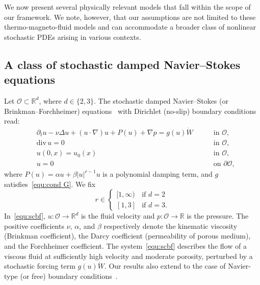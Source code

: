 \documentclass[11pt, reqno]{amsart}
\theoremstyle{definition}
\numberwithin{equation}{section}
\newcommand{\bb}{\mathbb}
\newcommand{\divg}{\mathrm{div}\,}
\newcommand{\abs}[1]{\left|{#1}\right|}
\begin{document}
We now present several physically relevant models that fall within the scope of our framework. We note, however, that our assumptions are not limited to these thermo-magneto-fluid models and can accommodate a broader class of nonlinear stochastic PDEs arising in various contexts.


\subsection{A class of stochastic damped Navier--Stokes equations}\label{sec:scbf}

Let $\mathscr{O}\subset\bb{R}^d$, where $d\in \{2,3\}$. The stochastic damped Navier--Stokes (or Brinkman--Forchheimer) equations~\cite{BrzFer19, CaiJiu08, GaoLiu19b, GaoLiu19, HajRob17, KinCipMoh25, KinMoh23, LiuGao18} with Dirichlet (no-slip) boundary conditions read:
\begin{subequations}\label{equ:scbf}
	\begin{alignat}{2}
		&\partial_t u - \nu \Delta u + (u\cdot\nabla)u + P(u) + \nabla p = g(u)\dot{W}
		\; && \quad\text{in $\mathscr{O}$,}
		\label{equ:scbf a}
		\\[1ex]
		&\divg u = 0
		\; && \quad\text{in $\mathscr{O}$,}
		\label{equ:scbf b}
		\\[1ex]
		&u(0,x)= u_0(x) 
		\; && \quad\text{in $\mathscr{O}$,}
		\label{equ:scbf c}
		\\[1ex]
		&u = 0
		\; && \quad\text{on $\partial\mathscr{O}$,}
		\label{equ:scbf d}
	\end{alignat}
\end{subequations}
where $P(u)=\alpha u +\beta \abs{u}^{r-1} u$ is a polynomial damping term, and $g$ satisfies~\eqref{equ:cond G}. We fix 
\begin{equation}\label{equ:r}
	r\in
	\begin{cases}
		[1,\infty) & \text{if } d=2 \\
		[1,3] & \text{if } d=3.
	\end{cases}
\end{equation}
In~\eqref{equ:scbf}, $u:\mathscr{O}\to \bb{R}^d$ is the fluid velocity and $p:\mathscr{O}\to \bb{R}$ is the pressure. The positive coefficients $\nu$, $\alpha$, and $\beta$ respectively denote the kinematic viscosity (Brinkman coefficient), the Darcy coefficient (permeability of porous medium), and the Forchheimer coefficient. The system~\eqref{equ:scbf} describes the flow of a viscous fluid at sufficiently high velocity and moderate porosity, perturbed by a stochastic forcing term $g(u)\dot{W}$. Our results also extend to the case of Navier-type (or free) boundary conditions~\cite{AmrRej14, Zia98}.
\end{document}
